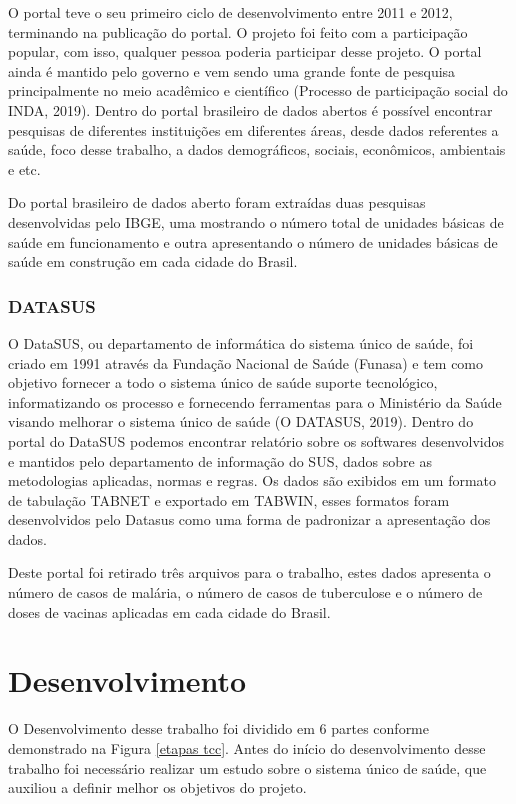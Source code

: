 \documentclass[
	12pt,				%
	openright,			%
	oneside,			%
	a4paper,			%
	chapter=TITLE,		%
	section=TITLE,		%
	subsection=TITLE,	%
	subsubsection=TITLE,%
	english,			%
	brazil				%
	]{abntex2}
\theoremstyle{definition}
\begin{document}
    O portal teve o seu primeiro ciclo de desenvolvimento entre 2011 e 2012, terminando na publicação do portal. O projeto foi feito com a participação popular, com isso, qualquer pessoa poderia participar desse projeto. O portal ainda é mantido pelo governo e vem sendo uma grande fonte de pesquisa principalmente no meio acadêmico e científico (Processo de participação social do INDA, 2019). Dentro do portal brasileiro de dados abertos é possível encontrar pesquisas de diferentes instituições em diferentes áreas, desde dados referentes a saúde, foco desse trabalho, a dados demográficos, sociais, econômicos, ambientais e etc. 
    
    Do portal brasileiro de dados aberto foram extraídas duas pesquisas desenvolvidas pelo IBGE, uma mostrando o número total de unidades básicas de saúde em funcionamento e outra apresentando o número de unidades básicas de saúde em construção em cada cidade do Brasil. 
    
\subsection{DATASUS}

    O DataSUS, ou departamento de informática do sistema único de saúde, foi criado em 1991 através da Fundação Nacional de Saúde (Funasa) e tem como objetivo fornecer a todo o sistema único de saúde suporte tecnológico, informatizando os processo e fornecendo ferramentas para o Ministério da Saúde visando melhorar o sistema único de saúde (O DATASUS, 2019). Dentro do portal do DataSUS podemos encontrar relatório sobre os softwares desenvolvidos e mantidos pelo departamento de informação do SUS, dados sobre as metodologias aplicadas, normas e regras. Os dados são exibidos em um formato de tabulação TABNET e exportado em TABWIN, esses formatos foram desenvolvidos pelo Datasus como uma forma de padronizar a apresentação dos dados. 
    
    Deste portal foi retirado três arquivos para o trabalho, estes dados apresenta o número de casos de malária, o número de casos de tuberculose e o número de doses de vacinas aplicadas em cada cidade do Brasil. 
    

\chapter{Desenvolvimento}
    
    O Desenvolvimento desse trabalho foi dividido em 6 partes conforme demonstrado na Figura \ref{etapas tcc}. Antes do início do desenvolvimento desse trabalho foi necessário realizar um estudo sobre o sistema único de saúde, que auxiliou a definir melhor os objetivos do projeto. 
    
\end{document}
